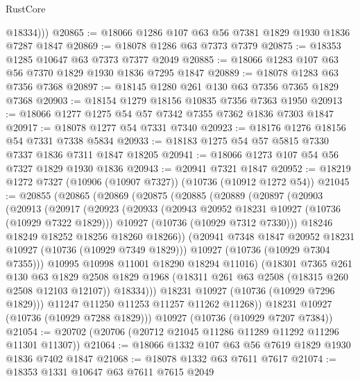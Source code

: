 \begin{lexlean}{RustCore}
\begin{coremodule}
          @18334)))
@20865 := @18066 @1286 @107 @63 @56 @7381 @1829 @1930 @1836 @7287 @1847
@20869 := @18078 @1286 @63 @7373 @7379
@20875 := @18353 @1285 @10647 @63 @7373 @7377 @2049
@20885 := @18066 @1283 @107 @63 @56 @7370 @1829 @1930 @1836 @7295 @1847
@20889 := @18078 @1283 @63 @7356 @7368
@20897 := @18145 @1280 @261 @130 @63 @7356 @7365 @1829 @7368
@20903 := @18154 @1279 @18156 @10835 @7356 @7363 @1950
@20913 := @18066 @1277 @1275 @54 @57 @7342 @7355 @7362 @1836 @7303 @1847
@20917 := @18078 @1277 @54 @7331 @7340
@20923 := @18176 @1276 @18156 @54 @7331 @7338 @5834
@20933 := @18183 @1275 @54 @57 @5815 @7330 @7337 @1836 @7311 @1847 @18205
@20941 := @18066 @1273 @107 @54 @56 @7327 @1829 @1930 @1836
@20943 := @20941 @7321 @1847
@20952 := @18219 @1272 @7327 (@10906 (@10907 @7327)) (@10736 (@10912 @1272 @54))
@21045 := @20855
    (@20865
      (@20869
        (@20875
          (@20885
            (@20889
              (@20897
                (@20903
                  (@20913
                    (@20917
                      (@20923
                        (@20933
                          (@20943 @20952 @18231 @10927 (@10736 (@10929 @7322 @1829)))
                          @10927
                          (@10736 (@10929 @7312 @7330)))
                        @18246
                        @18249
                        @18252
                        @18256
                        @18260
                        @18266))
                    (@20941 @7348 @1847 @20952 @18231 @10927 (@10736 (@10929 @7349 @1829)))
                    @10927
                    (@10736 (@10929 @7304 @7355)))
                  @10995
                  @10998
                  @11001
                  @18290
                  @18294
                  @11016)
                (@18301
                  @7365
                  @261
                  @130
                  @63
                  @1829
                  @2508
                  @1829
                  @1968
                  (@18311 @261 @63 @2508 (@18315 @260 @2508 @12103 @12107))
                  @18334)))
            @18231
            @10927
            (@10736 (@10929 @7296 @1829)))
          @11247
          @11250
          @11253
          @11257
          @11262
          @11268))
      @18231
      @10927
      (@10736 (@10929 @7288 @1829)))
    @10927
    (@10736 (@10929 @7207 @7384))
@21054 := @20702 (@20706 (@20712 @21045 @11286 @11289 @11292 @11296 @11301 @11307))
@21064 := @18066 @1332 @107 @63 @56 @7619 @1829 @1930 @1836 @7402 @1847
@21068 := @18078 @1332 @63 @7611 @7617
@21074 := @18353 @1331 @10647 @63 @7611 @7615 @2049

\end{coremodule}
\end{lexlean}
